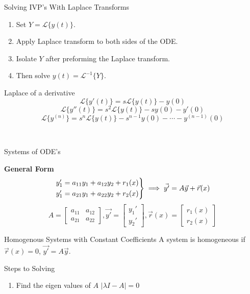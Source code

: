 \documentclass{article}
\begin{document}
\begin{multicols*}{3}
\begin{blackbox}{Solving IVP's With Laplace Transforms}
{    \begin{enumerate}[leftmargin=7pt]
        \item Set $Y = \mathcal{L}\{y(t)\}$.
        \item Apply Laplace transform to both sides of the ODE. 
        \item Isolate $Y$ after preforming the Laplace transform. 
        \item Then solve $y(t) = \mathcal{L}^{-1}\{Y\}$.
    \end{enumerate}
    }
    \vspace{-1.25ex}
    \begin{redbox}{Laplace of a derivative}
        \[\mathcal{L}\{y'(t)\} = s\mathcal{L}\{y(t)\} - y(0)\]
        \[\mathcal{L}\{y''(t)\} = s^2\mathcal{L}\{y(t)\} - sy(0) - y'(0)\]
        \[\mathcal{L}\{y^{(n)}\} = s^n\mathcal{L}\{y(t)\} - s^{n-1}y(0) - \cdots - y^{(n-1)}(0)\]
    \end{redbox}\\[-2ex]
\end{blackbox}
\begin{blackbox}{Systems of ODE's}
    {\footnotesize
    \textbf{General Form}\\[-2ex]
    \[\begin{rcases}
        y_1' = a_{11}y_1 + a_{12}y_2 + r_1(x)\\
        y_1' = a_{21}y_1 + a_{22}y_2 + r_2(x)  
    \end{rcases} \implies \vec{y'} = A\vec{y} + \vec{r}(x)\]
    \[A = \begin{bmatrix}
        a_{11} & a_{12}\\
        a_{21} & a_{22}
    \end{bmatrix}, \vec{y'} = \begin{bmatrix}
        y_1'\\
        y_2'
    \end{bmatrix}, \vec{r}(x) = \begin{bmatrix}
        r_1(x)\\
        r_2(x)
    \end{bmatrix}\]
    \begin{redbox}{Homogenous Systems with Constant Coefficients}
        A system is homogeneous if $\vec{r}(x) = 0$, $\vec{y'} = A\vec{y}$.
        \begin{brownbox}{Steps to Solving}
            \begin{enumerate}[leftmargin=5pt]
                \item Find the eigen values of $A$ $|\lambda I - A| = 0$

\end{enumerate}
\end{brownbox}
\end{redbox}}
\end{blackbox}
\end{multicols*}
\end{document}
